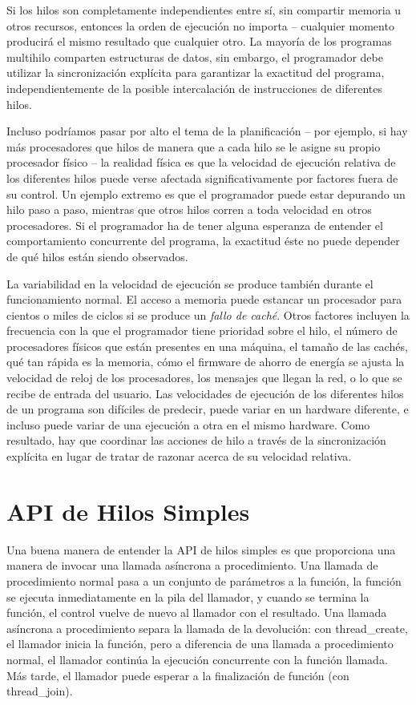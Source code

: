 \documentclass[10pt]{book}
\begin{document}
Si los hilos son completamente independientes entre sí, sin compartir memoria u otros recursos, entonces la orden de ejecución no importa -- cualquier momento producirá el mismo resultado que cualquier otro. La mayoría de los programas multihilo comparten estructuras de datos, sin embargo, el programador debe utilizar la sincronización explícita para garantizar la exactitud del programa, independientemente de la posible intercalación de instrucciones de diferentes hilos.

Incluso podríamos pasar por alto el tema de la planificación -- por ejemplo, si hay más procesadores que hilos de manera que a cada hilo se le asigne su propio procesador físico -- la realidad física es que la velocidad de ejecución relativa de los diferentes hilos puede verse afectada significativamente por factores fuera de su control. Un ejemplo extremo es que el programador puede estar depurando un hilo paso a paso, mientras que otros hilos corren a toda velocidad en otros procesadores. Si el programador ha de tener alguna esperanza de entender el comportamiento concurrente del programa, la exactitud éste no puede depender de qué hilos están siendo observados.

La variabilidad en la velocidad de ejecución se produce también durante el funcionamiento normal. El acceso a memoria puede estancar un procesador para cientos o miles de ciclos si se produce un \textit{fallo de caché}. Otros factores incluyen la frecuencia con la que el programador tiene prioridad sobre el hilo, el número de procesadores físicos que están presentes en una máquina, el tamaño de las cachés, qué tan rápida es la memoria, cómo el firmware de ahorro de energía se ajusta la velocidad de reloj de los procesadores, los mensajes que llegan la red, o lo que se recibe de entrada del usuario. Las velocidades de ejecución de los diferentes hilos de un programa son difíciles de predecir, puede variar en un hardware diferente, e incluso puede variar de una ejecución a otra en el mismo hardware. Como resultado, hay que coordinar las acciones de hilo a través de la sincronización explícita en lugar de tratar de razonar acerca de su velocidad relativa.

\section{API de Hilos Simples}
Una buena manera de entender la API de hilos simples es que proporciona una manera de invocar una llamada asíncrona a procedimiento. Una llamada de procedimiento normal pasa a un conjunto de parámetros a la función, la función se ejecuta inmediatamente en la pila del llamador, y cuando se termina la función, el control vuelve de nuevo al llamador con el resultado. Una llamada asíncrona a procedimiento separa la llamada de la devolución: con {\mf thread\_create}, el llamador inicia la función, pero a diferencia de una llamada a procedimiento normal, el llamador continúa la ejecución concurrente con la función llamada. Más tarde, el llamador puede esperar a la finalización de función (con {\mf thread\_join}).
\end{document}
